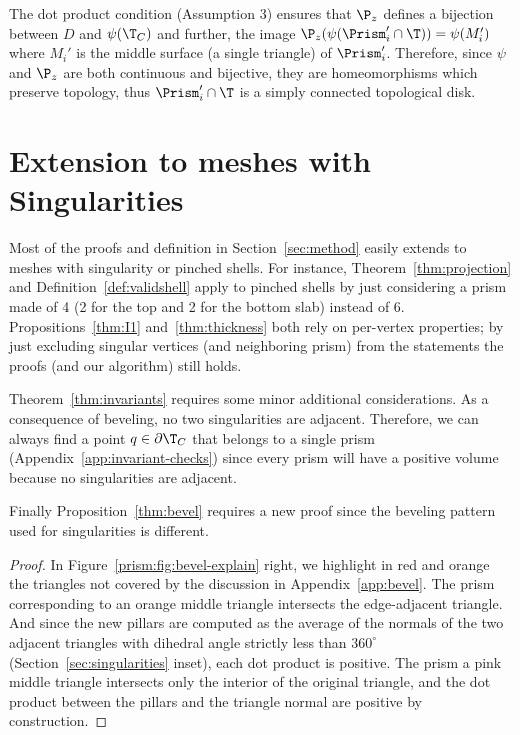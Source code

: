 The dot product condition (Assumption 3) ensures that $\P_z$ defines a bijection between $D$ and $\psi(\T_C)$\revision{;} and further, the image  $\P_z(\psi(\Prism_i'\cap \T)) = \psi(M_i')$ where $M_i'$ is the middle surface (a single triangle) of $\Prism_i'$.
Therefore, since $\psi$ and $\P_z$ are both continuous and bijective, they are homeomorphisms which preserve topology, 
thus $\Prism_i'\cap \T $ is a simply connected topological disk.


\section{Extension to meshes with Singularities}\label{app:singularity}
Most of the proofs and definition in Section~\ref{sec:method} easily extends to meshes with singularity or pinched shells. For instance,
 Theorem~\ref{thm:projection} and Definition~\ref{def:validshell} apply to pinched shells by just considering a prism made of 4 (2 for the top and 2 for the bottom slab) instead of 6. Propositions~\ref{thm:I1} and~\ref{thm:thickness} both rely on per-vertex properties; by just excluding singular vertices (and neighboring prism) from the statements the proofs (and our algorithm) still holds.


Theorem~\ref{thm:invariants} requires some minor additional considerations. As a consequence of beveling, no two singularities are adjacent. Therefore, we can always find a point $q \in \partial \T_C$ that belongs to a single prism (Appendix~\ref{app:invariant-checks}) since every prism will have a positive volume
because no singularities are adjacent.


Finally Proposition~\ref{thm:bevel} requires a new proof since the beveling pattern used for singularities is different.
\begin{proof}
In  Figure~\ref{prism:fig:bevel-explain} right, we highlight in red and orange the triangles not covered by the discussion in Appendix~\ref{app:bevel}. 
The prism corresponding to an orange middle triangle intersects the edge-adjacent triangle. And since the new pillars are computed as the average of the normals of the two adjacent triangles with dihedral angle strictly less than $360^\circ$ 
 (Section~\ref{sec:singularities} inset), each dot product is positive. 
The prism  a pink middle triangle intersects only the interior of the original triangle, and the dot product between the pillars and the triangle normal are positive by construction. %
\end{proof}



